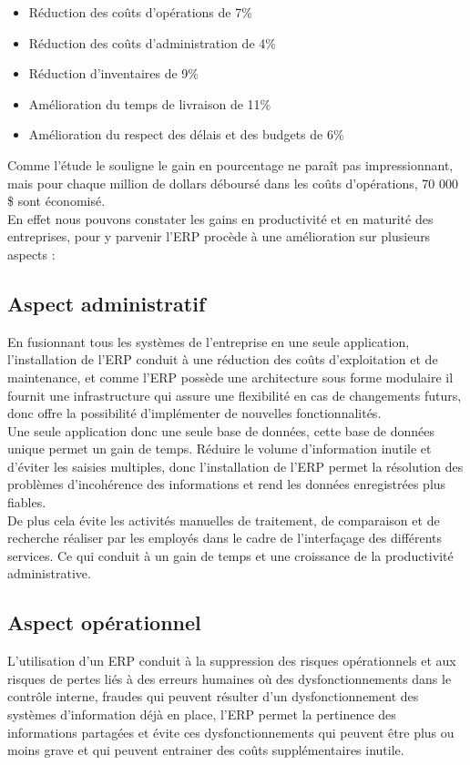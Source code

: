         \begin{itemize}
            \item Réduction des coûts d’opérations de 7\%
            \item Réduction des coûts d’administration de 4\%
            \item Réduction d’inventaires de 9\%
            \item Amélioration du temps de livraison de 11\%
            \item Amélioration du respect des délais et des budgets de 6\%\\
        \end{itemize}

        Comme l’étude le souligne le gain en pourcentage ne paraît pas impressionnant, mais pour chaque million de dollars déboursé dans les coûts d’opérations, 70 000 \$ sont économisé.\\

        En effet nous pouvons constater les gains en productivité et en maturité des entreprises, pour y parvenir l’ERP procède à une amélioration sur plusieurs aspects :

    \subsection{Aspect administratif}
        En fusionnant tous les systèmes de l’entreprise en une seule application, l’installation de l’ERP conduit à une réduction des coûts d’exploitation et de maintenance, et comme l’ERP possède une architecture sous forme modulaire il fournit une infrastructure qui assure une flexibilité en cas de changements futurs, donc offre la possibilité d’implémenter de nouvelles fonctionnalités.\\

        Une seule application donc une seule base de données, cette base de données unique permet un gain de temps. Réduire le volume d’information inutile et d’éviter les saisies multiples, donc l’installation de l’ERP permet la résolution des problèmes d’incohérence des informations et rend les données enregistrées plus fiables.\\

        De plus cela évite les activités manuelles de traitement, de comparaison et de recherche réaliser par les employés dans le cadre de l’interfaçage des différents services. Ce qui conduit à un gain de temps et une croissance de la productivité administrative.

    \subsection{Aspect opérationnel}
        L’utilisation d’un ERP conduit à la suppression des risques opérationnels et aux risques de pertes liés à des erreurs humaines où des dysfonctionnements dans le contrôle interne, fraudes qui peuvent résulter d’un dysfonctionnement des systèmes d’information déjà en place, l’ERP permet la pertinence des informations partagées et évite ces dysfonctionnements qui peuvent être plus ou moins grave et qui peuvent entrainer des coûts supplémentaires inutile.\\

